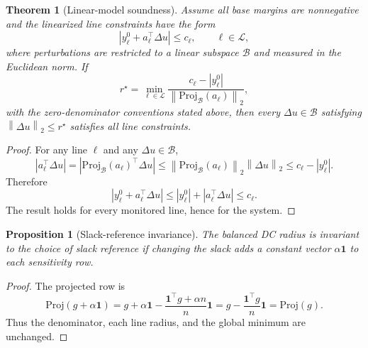 \documentclass[11pt]{article}
\newtheorem{proposition}{Proposition}
\newtheorem{theorem}{Theorem}
\newcommand{\ones}{\mathbf{1}}
\newcommand{\norm}[1]{\left\lVert #1 \right\rVert}
\newcommand{\abs}[1]{\left\lvert #1 \right\rvert}
\newcommand{\Proj}{\mathrm{Proj}}
\begin{document}
\begin{theorem}[Linear-model soundness]
\label{thm:soundness}
Assume all base margins are nonnegative and the linearized line constraints have the form
\begin{equation}
  \abs{y_\ell^0 + a_\ell^\top\Delta u}\le c_\ell,
  \qquad \ell\in\mathcal{L},
\end{equation}
where perturbations are restricted to a linear subspace $\mathcal{B}$ and measured in the Euclidean norm. If
\begin{equation}
  r^\star = \min_{\ell\in\mathcal{L}}
  \frac{c_\ell-\abs{y_\ell^0}}{\norm{\Proj_{\mathcal{B}}(a_\ell)}_2},
\end{equation}
with the zero-denominator conventions stated above, then every $\Delta u\in\mathcal{B}$ satisfying $\norm{\Delta u}_2\le r^\star$ satisfies all line constraints.
\end{theorem}

\begin{proof}
For any line $\ell$ and any $\Delta u\in\mathcal{B}$,
\begin{equation}
  \abs{a_\ell^\top\Delta u}
  =
  \abs{\Proj_{\mathcal{B}}(a_\ell)^\top\Delta u}
  \le
  \norm{\Proj_{\mathcal{B}}(a_\ell)}_2\norm{\Delta u}_2
  \le
  c_\ell-\abs{y_\ell^0}.
\end{equation}
Therefore
\begin{equation}
  \abs{y_\ell^0+a_\ell^\top\Delta u}
  \le
  \abs{y_\ell^0}+\abs{a_\ell^\top\Delta u}
  \le c_\ell.
\end{equation}
The result holds for every monitored line, hence for the system.
\end{proof}

\begin{proposition}[Slack-reference invariance]
\label{prop:slack}
The balanced DC radius is invariant to the choice of slack reference if changing the slack adds a constant vector $\alpha\ones$ to each sensitivity row.
\end{proposition}

\begin{proof}
The projected row is
\begin{equation}
  \Proj(g+\alpha\ones)
  =
  g+\alpha\ones
  -
  \frac{\ones^\top g + \alpha n}{n}\ones
  =
  g-\frac{\ones^\top g}{n}\ones
  =
  \Proj(g).
\end{equation}
Thus the denominator, each line radius, and the global minimum are unchanged.
\end{proof}
\end{document}
